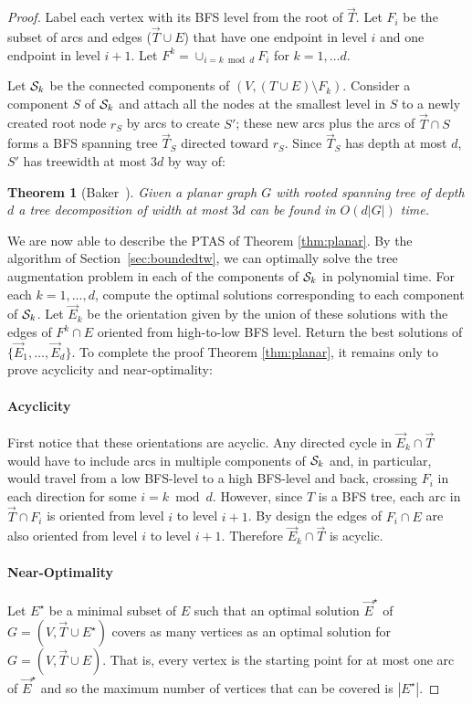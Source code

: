 \documentclass{article}
\newtheorem{theorem}{Theorem}
\newcommand{\ora}{\overrightarrow}
\begin{document}
\begin{proof}
Label each vertex with its BFS level from the root of $\ora T$.  Let
$F_i$ be the subset of arcs and edges ($\ora T \cup E$) that have one
endpoint in level $i$ and one endpoint in level $i+1$.  Let $F^k =
\cup_{i = k\bmod d} F_i$ for $k = 1,\ldots d$.

Let ${\cal S}_k$ be the connected components of $(V,(T \cup E)
\setminus F_k)$.  Consider a component $S$ of ${\cal S}_k$ and attach
all the nodes at the smallest level in $S$ to a newly created root
node $r_S$ by arcs to create $S'$; these new arcs plus the arcs of
$\ora T \cap S$ forms a BFS spanning tree $\ora T_S$ directed toward
$r_S$.  Since $\ora T_S$ has depth at most $d$, $S'$ has treewidth at
most $3d$ by way of:
\begin{theorem}[Baker~\cite{Baker1994}]
  Given a planar graph $G$ with rooted spanning tree of depth $d$ a
  tree decomposition of width at most $3d$ can be found in $O(d|G|)$
  time.
\end{theorem}


We are now able to describe the PTAS of Theorem \ref{thm:planar}.
By the algorithm of Section~\ref{sec:boundedtw}, we can optimally solve the {\sc tree augmentation} problem in each of the components of ${\cal S}_k$ in polynomial time. 
For each $k = 1,...,d$, compute the optimal solutions corresponding to each component of ${\cal S}_k$.  
Let $\ora E_k$ be the orientation given by the union of these solutions with the edges of $F^k\cap E$ oriented from high-to-low BFS level.  
Return the best solutions of $\{\ora E_1, \ldots, \ora E_d\}$.
To complete the proof Theorem \ref{thm:planar}, it remains only to prove acyclicity and near-optimality:
\paragraph{Acyclicity} First notice that these orientations are
acyclic.  Any directed cycle in $\ora E_k \cap \ora T$ would have to
include arcs in multiple components of ${\cal S}_k$ and, in
particular, would travel from a low BFS-level to a high
BFS-level and back, crossing $F_i$ in each direction for some $i =
k\bmod d$.  However, since $T$ is a BFS tree, each arc in $\ora T \cap
F_i$ is oriented from level $i$ to level $i+1$.  By design the edges
of $F_i \cap E$ are also oriented from level $i$ to level $i+1$.
Therefore $\ora E_k \cap \ora T$ is acyclic.
\paragraph{Near-Optimality} Let $E^\star$ be a minimal subset of $E$ such that an optimal solution
$\ora E^\star$ of $G=(V,\ora T\cup E^\star)$ covers as many vertices
as an optimal solution for $G=(V,\ora T\cup E)$.  That is, every
vertex is the starting point for at most one arc of $\ora E^\star$ and
so the maximum number of vertices that can be covered is $|E^\star|$.


\end{proof}
\end{document}
